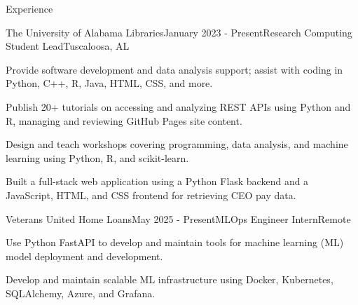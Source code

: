 \documentclass[
	10.5pt, %
]{resume} %
\begin{document}

\begin{rSection}{Experience}

	\begin{rSubsection2}{The University of Alabama Libraries}{January 2023 - Present}{Research Computing Student Lead}{Tuscaloosa, AL}
		\item Provide software development and data analysis support; assist with coding in Python, C++, R, Java, HTML, CSS, and more.
		\item Publish 20+ tutorials on accessing and analyzing REST APIs using Python and R, managing and reviewing GitHub Pages site content.
		\item Design and teach workshops covering programming, data analysis, and machine learning using Python, R, and scikit-learn.
		\item Built a full-stack web application using a Python Flask backend and a JavaScript, HTML, and CSS frontend for retrieving CEO pay data.
	\end{rSubsection2}

	\begin{rSubsection2}{Veterans United Home Loans}{May 2025 - Present}{MLOps Engineer Intern}{Remote}
		\item Use Python FastAPI to develop and maintain tools for machine learning (ML) model deployment and development.
		\item Develop and maintain scalable ML infrastructure using Docker, Kubernetes, SQLAlchemy, Azure, and Grafana.
	\end{rSubsection2}



\end{rSection}
\end{document}

